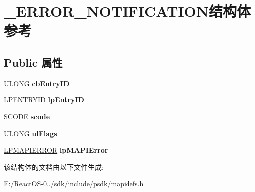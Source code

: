 \hypertarget{struct___e_r_r_o_r___n_o_t_i_f_i_c_a_t_i_o_n}{}\section{\+\_\+\+E\+R\+R\+O\+R\+\_\+\+N\+O\+T\+I\+F\+I\+C\+A\+T\+I\+O\+N结构体 参考}
\label{struct___e_r_r_o_r___n_o_t_i_f_i_c_a_t_i_o_n}
\subsection*{Public 属性}
\begin{DoxyCompactItemize}
\item 
\mbox{\label{struct___e_r_r_o_r___n_o_t_i_f_i_c_a_t_i_o_n_a1403de8eb842934871203706c026cf00}} 
U\+L\+O\+NG {\bfseries cb\+Entry\+ID}
\item 
\mbox{\label{struct___e_r_r_o_r___n_o_t_i_f_i_c_a_t_i_o_n_a3a55eafcaf04ea0a54bf999e212c4274}} 
\hyperlink{struct___e_n_t_r_y_i_d}{L\+P\+E\+N\+T\+R\+Y\+ID} {\bfseries lp\+Entry\+ID}
\item 
\mbox{\label{struct___e_r_r_o_r___n_o_t_i_f_i_c_a_t_i_o_n_a66880b0867d8282261b633ba76474b44}} 
S\+C\+O\+DE {\bfseries scode}
\item 
\mbox{\label{struct___e_r_r_o_r___n_o_t_i_f_i_c_a_t_i_o_n_a22877c93f38358ef7ba3c8edaef9d5f6}} 
U\+L\+O\+NG {\bfseries ul\+Flags}
\item 
\mbox{\label{struct___e_r_r_o_r___n_o_t_i_f_i_c_a_t_i_o_n_a0cff32f3369f53b5bf697b705c5b0948}} 
\hyperlink{struct___m_a_p_i_e_r_r_o_r}{L\+P\+M\+A\+P\+I\+E\+R\+R\+OR} {\bfseries lp\+M\+A\+P\+I\+Error}
\end{DoxyCompactItemize}


该结构体的文档由以下文件生成\+:\begin{DoxyCompactItemize}
\item 
E\+:/\+React\+O\+S-\/0../sdk/include/psdk/mapidefs.\+h\end{DoxyCompactItemize}
